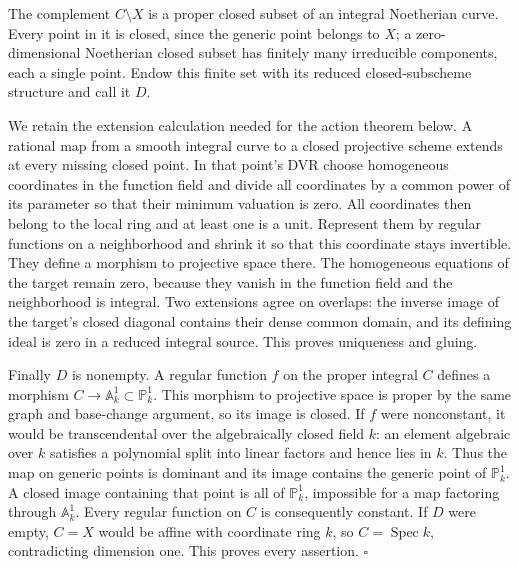 \documentclass[11pt,a4paper,openany]{report}
\newcounter{none}
\begin{document}
The complement \(C\setminus X\) is a proper closed subset of an integral Noetherian curve. Every point in it is closed, since the generic point belongs to \(X\); a zero-dimensional Noetherian closed subset has finitely many irreducible components, each a single point. Endow this finite set with its reduced closed-subscheme structure and call it \(D\).

We retain the extension calculation needed for the action theorem below. A rational map from a smooth integral curve to a closed projective scheme extends at every missing closed point. In that point's DVR choose homogeneous coordinates in the function field and divide all coordinates by a common power of its parameter so that their minimum valuation is zero. All coordinates then belong to the local ring and at least one is a unit. Represent them by regular functions on a neighborhood and shrink it so that this coordinate stays invertible. They define a morphism to projective space there. The homogeneous equations of the target remain zero, because they vanish in the function field and the neighborhood is integral. Two extensions agree on overlaps: the inverse image of the target's closed diagonal contains their dense common domain, and its defining ideal is zero in a reduced integral source. This proves uniqueness and gluing.

Finally \(D\) is nonempty. A regular function \(f\) on the proper integral \(C\) defines a morphism \(C\to\mathbb A^1_k\subset\mathbb P^1_k\). This morphism to projective space is proper by the same graph and base-change argument, so its image is closed. If \(f\) were nonconstant, it would be transcendental over the algebraically closed field \(k\): an element algebraic over \(k\) satisfies a polynomial split into linear factors and hence lies in \(k\). Thus the map on generic points is dominant and its image contains the generic point of \(\mathbb P^1_k\). A closed image containing that point is all of \(\mathbb P^1_k\), impossible for a map factoring through \(\mathbb A^1_k\). Every regular function on \(C\) is consequently constant. If \(D\) were empty, \(C=X\) would be affine with coordinate ring \(k\), so \(C=\operatorname{Spec}k\), contradicting dimension one. This proves every assertion. \(\square\)
\end{document}
